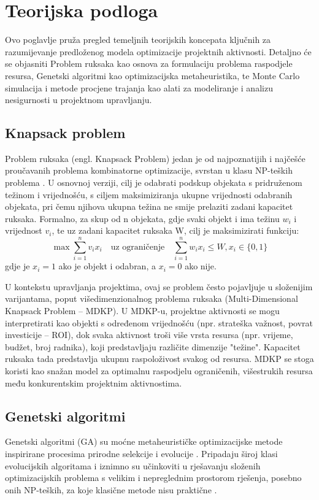 \section{Teorijska podloga}
Ovo poglavlje pruža pregled temeljnih teorijskih koncepata ključnih za razumijevanje predloženog modela optimizacije projektnih aktivnosti. Detaljno će se objasniti Problem ruksaka kao osnova za formulaciju problema raspodjele resursa, Genetski algoritmi kao optimizacijska metaheuristika, te Monte Carlo simulacija i metode procjene trajanja kao alati za modeliranje i analizu nesigurnosti u projektnom upravljanju.

\subsection{Knapsack problem}
Problem ruksaka (engl. Knapsack Problem) jedan je od najpoznatijih i najčešće proučavanih problema kombinatorne optimizacije, svrstan u klasu NP-teških problema \cite{Goldberg1989}. U osnovnoj verziji, cilj je odabrati podskup objekata s pridruženom težinom i vrijednošću, s ciljem maksimiziranja ukupne vrijednosti odabranih objekata, pri čemu njihova ukupna težina ne smije prelaziti zadani kapacitet ruksaka. Formalno, za skup od n objekata, gdje svaki objekt i ima težinu $w_i$ i vrijednost $v_i$, te uz zadani kapacitet ruksaka W, cilj je maksimizirati funkciju:
$$
\max \sum_{i=1}^n v_i x_i \quad \text{uz ograničenje} \quad \sum_{i=1}^n w_i x_i \leq W, x_i \in \{0,1\}
$$
gdje je $x_i=1$ ako je objekt i odabran, a $x_i=0$ ako nije.

U kontekstu upravljanja projektima, ovaj se problem često pojavljuje u složenijim varijantama, poput višedimenzionalnog problema ruksaka (Multi-Dimensional Knapsack Problem – MDKP). U MDKP-u, projektne aktivnosti se mogu interpretirati kao objekti s određenom vrijednošću (npr. strateška važnost, povrat investicije – ROI), dok svaka aktivnost troši više vrsta resursa (npr. vrijeme, budžet, broj radnika), koji predstavljaju različite dimenzije "težine". Kapacitet ruksaka tada predstavlja ukupnu raspoloživost svakog od resursa. MDKP se stoga koristi kao snažan model za optimalnu raspodjelu ograničenih, višestrukih resursa među konkurentskim projektnim aktivnostima.

\subsection{Genetski algoritmi}
Genetski algoritmi (GA) su moćne metaheurističke optimizacijske metode inspirirane procesima prirodne selekcije i evolucije \cite{Goldberg1989, Mitchell1998}. Pripadaju široj klasi evolucijskih algoritama i iznimno su učinkoviti u rješavanju složenih optimizacijskih problema s velikim i nepreglednim prostorom rješenja, posebno onih NP-teških, za koje klasične metode nisu praktične \cite{Gandomi2013, Kaveh2012}.

